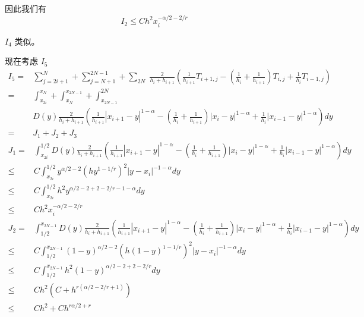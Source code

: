 \documentclass{ctexart}
\begin{document}
因此我们有
\begin{equation}
    I_2 \le C h^2 x_i^{-\alpha/2-2/r}
\end{equation}

\(I_4\) 类似。

\newpage

现在考虑 \(I_5\)
\begin{equation}
    \begin{aligned}
        I_5 = & \sum_{j=2i+1}^{N} + \sum_{j=N+1}^{2N-1} + \sum_{2N} \; \frac{2}{h_i + h_{i+1}} 
        \left( \frac{1}{h_{i+1}} T_{i+1, j} - (\frac{1}{h_{i}}+\frac{1}{h_{i+1}}) T_{i,j} + \frac{1}{h_{i}} T_{i-1, j} \right)  \\
        = & \int_{x_{2i}}^{x_{N}} +\int_{x_{N}}^{x_{2N-1}} + \int_{x_{2N-1}}^{2N}               \\ 
        & D(y) \frac{2}{h_i + h_{i+1}} 
        ( \frac{1}{h_{i+1}} |x_{i+1}-y|^{1-\alpha} 
        - (\frac{1}{h_{i}}+\frac{1}{h_{i+1}}) |x_{i}-y|^{1-\alpha}
        +  \frac{1}{h_{i}}|x_{i-1}-y|^{1-\alpha} )  dy  \\
        =& J_1 + J_2 + J_3
    \end{aligned}
\end{equation}
\begin{equation}
    \begin{aligned}
        J_1 =& \int_{x_{2i}}^{1/2} 
        D(y) \frac{2}{h_i + h_{i+1}} 
        ( \frac{1}{h_{i+1}} |x_{i+1}-y|^{1-\alpha} 
        - (\frac{1}{h_{i}}+\frac{1}{h_{i+1}}) |x_{i}-y|^{1-\alpha}
        +  \frac{1}{h_{i}}|x_{i-1}-y|^{1-\alpha} )  dy  \\
        \le & C \int_{x_{2i}}^{1/2} y^{\alpha/2-2} (hy^{1-1/r})^2 |y-x_i|^{-1-\alpha} dy    \\
        \le & C \int_{x_{2i}}^{1/2} h^2 y^{\alpha/2-2 + 2-2/r -1-\alpha} dy     \\
        \le & C h^2 x_i^{-\alpha/2-2/r}
    \end{aligned}
\end{equation}
\begin{equation}
    \begin{aligned}
        J_2 =& \int_{1/2}^{x_{2N-1}} 
        D(y) \frac{2}{h_i + h_{i+1}} 
        ( \frac{1}{h_{i+1}} |x_{i+1}-y|^{1-\alpha} 
        - (\frac{1}{h_{i}}+\frac{1}{h_{i+1}}) |x_{i}-y|^{1-\alpha}
        +  \frac{1}{h_{i}}|x_{i-1}-y|^{1-\alpha} )  dy  \\
        \le & C \int_{1/2}^{x_{2N-1}} (1-y)^{\alpha/2-2} (h(1-y)^{1-1/r})^2 |y-x_i|^{-1-\alpha} dy    \\
        \le & C \int_{1/2}^{x_{2N-1}} h^2 (1-y)^{\alpha/2-2 + 2-2/r} dy     \\
        \le & C h^2 (C + h^{r(\alpha/2-2/r+1)})  \\
        \le &  Ch^2 + C h^{r\alpha/2+r}
    \end{aligned}
\end{equation}
\end{document}
